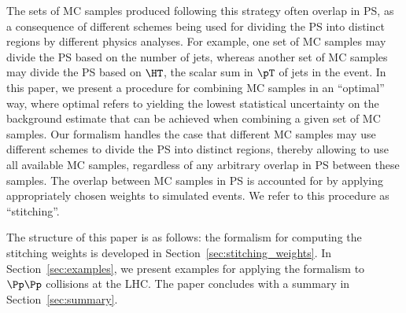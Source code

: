 The sets of MC samples produced following this strategy often overlap in PS,
as a consequence of different schemes being used for dividing the PS into distinct regions by different physics analyses.
For example, one set of MC samples may divide the PS based on the number of jets, 
whereas another set of MC samples may divide the PS based on $\HT$, the scalar sum in $\pT$ of jets in the event.
In this paper, we present a procedure for combining MC samples in an ``optimal'' way,
where optimal refers to yielding the lowest statistical uncertainty on the background estimate that can be achieved when combining a given set of MC samples.
Our formalism handles the case that different MC samples may use different schemes to divide the PS into distinct regions,
thereby allowing to use all available MC samples, regardless of any arbitrary overlap in PS between these samples.
The overlap between MC samples in PS is accounted for by applying appropriately chosen weights to simulated events.
We refer to this procedure as ``stitching''.

The structure of this paper is as follows:
the formalism for computing the stitching weights is developed in Section~\ref{sec:stitching_weights}.
In Section~\ref{sec:examples}, we present examples for applying the formalism to $\Pp\Pp$ collisions at the LHC.
The paper concludes with a summary in Section~\ref{sec:summary}.
